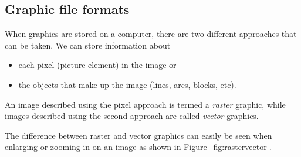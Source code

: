 \documentclass[a5paper, 10pt]{article}
\begin{document}
\subsection{Graphic file formats}
When graphics are stored on a computer, there are two different
approaches that can be taken.  We can store information about
\begin{itemize}
\item each pixel (picture element) in the image or
\item the objects that make up the image (lines, arcs, blocks, etc).
\end{itemize}

An image described using the pixel approach is termed a \emph{raster}
graphic, while images described using the second approach are called
\emph{vector} graphics.

The difference between raster and vector graphics can easily be seen
when enlarging or zooming in on an image as shown in
Figure~\ref{fig:rastervector}.
\end{document}
